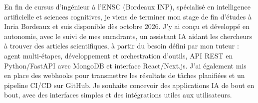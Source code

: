 
\begin{cvparagraph}
En fin de cursus d’ingénieur à l’ENSC (Bordeaux INP), spécialisé en intelligence artificielle et sciences cognitives, je viens de terminer mon stage de fin d’études à Inria Bordeaux et suis disponible dès octobre 2026. J’y ai conçu et développé en autonomie, avec le suivi de mes encadrants, un assistant IA aidant les chercheurs à trouver des articles scientifiques, à partir du besoin défini par mon tuteur : agent multi-étapes, développement et orchestration d’outils, API REST en Python/FastAPI avec MongoDB et interface React/Next.js. J’ai également mis en place des webhooks pour transmettre les résultats de tâches planifiées et un pipeline CI/CD sur GitHub. Je souhaite concevoir des applications IA de bout en bout, avec des interfaces simples et des intégrations utiles aux utilisateurs.
\end{cvparagraph}
